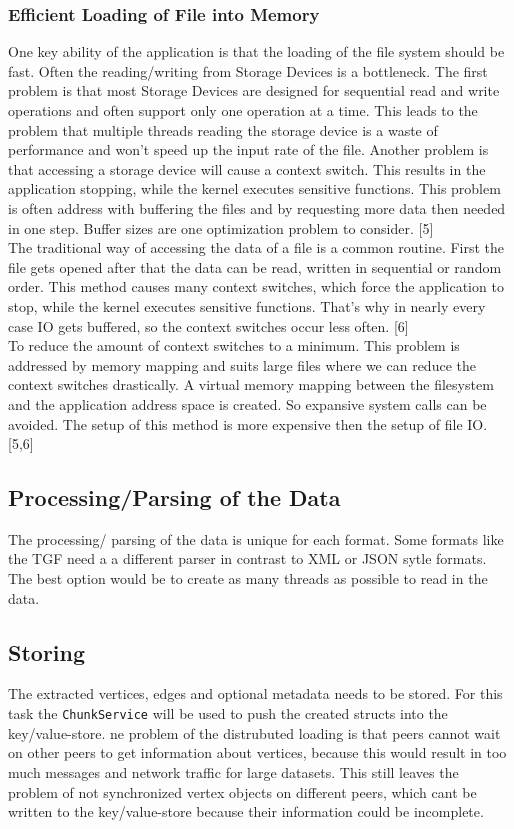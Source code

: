 \subsubsection{Efficient Loading of File into Memory}
One key ability of the application is that the loading of the file system should be fast. Often the reading/writing from Storage Devices is a bottleneck. The first problem is that most Storage Devices are designed for sequential read and write operations and often support only one operation at a time. This leads to the problem that multiple threads reading the storage device is a waste of performance and won’t speed up the input rate of the file. Another problem is that accessing a storage device will cause a context switch. This results in the application stopping, while the kernel executes sensitive functions. This problem is often address with buffering the files and by requesting more data then needed in one step. Buffer sizes are one optimization problem to consider. [5]\\
The traditional way of accessing the data of a file is a common routine. First the file gets opened after that the data can be read, written in sequential or random order. This method causes many context switches, which force the application to stop, while the kernel executes sensitive functions. That’s why in nearly every case IO gets buffered, so the context switches occur less often. [6]\\
To reduce the amount of context switches to a minimum. This problem is addressed by memory mapping and suits large files where we can reduce the context switches drastically. A virtual memory mapping between the filesystem and the application address space is created. So expansive system calls can be avoided. The setup of this method is more expensive then the setup of file IO. [5,6]\pageref{sec:FileReading}


\subsection{Processing/Parsing of the Data}
The processing/ parsing of the data is unique for each format. Some formats like the TGF need a a different parser in contrast to XML or JSON sytle formats. The best option would be to create as many threads as possible to read in the data.

\subsection{Storing}
The extracted vertices, edges and optional metadata needs to be stored. For this task the \texttt{ChunkService} will be used to push the created structs into the key/value-store. ne problem of the distrubuted loading is that peers cannot wait on other peers to get information about vertices, because this would result in too much messages and network traffic for large datasets. This still leaves the problem of not synchronized vertex objects on different peers, which cant be written to the key/value-store because their information could be incomplete. 
